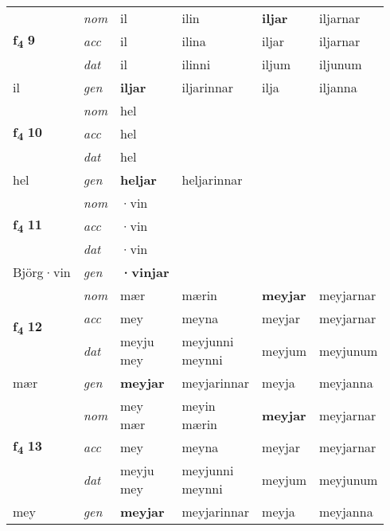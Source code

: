 \begin{longtable}[l]{X>{\footnotesize\itshape}XXXXX}
\multirow{3}{*}{{{\textbf{f{\textsubscript{4}}} \Large{\textbf{9}}}}} & nom & il & ilin & \textbf{iljar} & iljarnar \\*
 & acc & il & ilina & iljar & iljarnar \\*
 & dat & il & ilinni & iljum & iljunum \\*
 {\footnotesize{il}} & gen & \textbf{iljar} & iljarinnar & ilja & iljanna \\
\cmidrule{1-6}

\multirow{3}{*}{{{\textbf{f{\textsubscript{4}}} \Large{\textbf{10}}}}} & nom & hel &  & \textbf{} &  \\*
 & acc & hel &  &  &  \\*
 & dat & hel &  &  &  \\*
 {\footnotesize{hel}} & gen & \textbf{heljar} & heljarinnar &  &  \\
\cmidrule{1-6}

\multirow{3}{*}{{{\textbf{f{\textsubscript{4}}} \Large{\textbf{11}}}}} & nom & ·vin &  & \textbf{} &  \\*
 & acc & ·vin &  &  &  \\*
 & dat & ·vin &  &  &  \\*
 {\footnotesize{Björg\allowbreak ·vin}} & gen & \textbf{·vinjar} &  &  &  \\
\cmidrule{1-6}

\multirow{3}{*}{{{\textbf{f{\textsubscript{4}}} \Large{\textbf{12}}}}} & nom & mær & mærin & \textbf{meyjar} & meyjarnar \\*
 & acc & mey & meyna & meyjar & meyjarnar \\*
 & dat & \specialcell{meyju\\ mey} & \specialcell{meyjunni\\ meynni} & meyjum & meyjunum \\*
 {\footnotesize{mær}} & gen & \textbf{meyjar} & meyjarinnar & meyja & meyjanna \\
\cmidrule{1-6}

\multirow{3}{*}{{{\textbf{f{\textsubscript{4}}} \Large{\textbf{13}}}}} & nom & \specialcell{mey\\ mær} & \specialcell{meyin\\ mærin} & \textbf{meyjar} & meyjarnar \\*
 & acc & mey & meyna & meyjar & meyjarnar \\*
 & dat & \specialcell{meyju\\ mey} & \specialcell{meyjunni\\ meynni} & meyjum & meyjunum \\*
 {\footnotesize{mey}} & gen & \textbf{meyjar} & meyjarinnar & meyja & meyjanna \\
\cmidrule{1-6}


\end{longtable}
